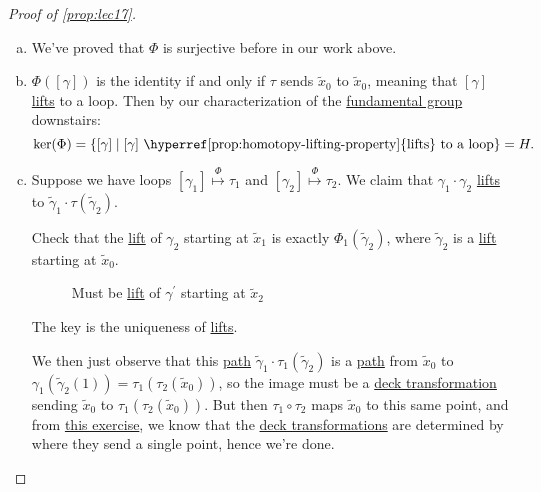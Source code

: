 \begin{proof}[Proof of \autoref{prop:lec17}]
	\begin{enumerate}[(a)]
		\item We've proved that \(\Phi \) is surjective before in our work above.
		\item \(\Phi ([\gamma ])\) is the identity if and only if \(\tau \) sends \(\widetilde{x} _0\) to \(\widetilde{x} _0\), meaning that \([\gamma ]\) \hyperref[prop:homotopy-lifting-property]{lifts} to a loop. Then by our characterization of the \hyperref[def:fundamental-group]{fundamental group} downstairs:
		      \[
			      \ker (\Phi ) = \left\{[\gamma ] \mid \text{\([\gamma ]\) \hyperref[prop:homotopy-lifting-property]{lifts} to a loop} \right\} = H.
		      \]
		\item Suppose we have loops \([\gamma _1]\overset{\Phi }{\mapsto } \tau _1\) and \([\gamma _2]\overset{\Phi }{\mapsto }\tau _2\). We claim that \(\gamma _1\cdot \gamma _2\) \hyperref[prop:homotopy-lifting-property]{lifts} to \(\widetilde{\gamma} _1\cdot \tau (\widetilde{\gamma} _2)\).
		      \begin{figure}[H]
			      \centering
			      \label{fig:pf:prop:lec17-1}
		      \end{figure}
		      \begin{exercise}
			      Check that the \hyperref[def:lift]{lift} of \(\gamma _2\) starting at \(\widetilde{x} _1\) is exactly \(\Phi _1(\widetilde{\gamma} _2)\), where \(\widetilde{\gamma} _2\) is a \hyperref[def:lift]{lift} starting at \(\widetilde{x} _0\).
			      \begin{figure}[H]
				      \centering
				      \caption{Must be \hyperref[def:lift]{lift} of \(\gamma ^\prime \) starting at \(\widetilde{x} _2\)}
				      \label{fig:pf:prop:lec17-2}
			      \end{figure}
		      \end{exercise}
		      \begin{answer}
			      The key is the uniqueness of \hyperref[prop:homotopy-lifting-property]{lifts}.
		      \end{answer}

		      We then just observe that this \hyperref[def:path]{path} \(\widetilde{\gamma} _1\cdot \tau _1(\widetilde{\gamma} _2)\) is a \hyperref[def:path]{path} from \(\widetilde{x} _0\) to \(\gamma_1(\widetilde{\gamma} _2(1)) = \tau_1(\tau _2(\widetilde{x} _0))\), so the image must be a \hyperref[def:deck-transformation]{deck transformation} sending \(\widetilde{x} _0\) to \(\tau _1(\tau _2(\widetilde{x} _0))\). But then \(\tau _1\circ \tau _2\) maps \(\widetilde{x} _0\) to this same point, and from \hyperref[ex:lec17]{this exercise}, we know that the \hyperref[def:deck-transformation]{deck transformations} are determined by where they send a single point, hence we're done.
	\end{enumerate}
\end{proof}

